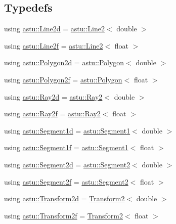 \subsection*{Typedefs}
\begin{DoxyCompactItemize}
\item 
using \hyperlink{group__math__group_ga9e9519d311982af417c5b7fd50fb4515}{astu\+::\+Line2d} = \hyperlink{classastu_1_1Line2}{astu\+::\+Line2}$<$ double $>$
\item 
using \hyperlink{group__math__group_ga6fbecdd0d3f742bdde8f5c000c3a8b5d}{astu\+::\+Line2f} = \hyperlink{classastu_1_1Line2}{astu\+::\+Line2}$<$ float $>$
\item 
using \hyperlink{group__math__group_gabc60e44721faec63659fd29e46d21522}{astu\+::\+Polygon2d} = \hyperlink{classastu_1_1Polygon}{astu\+::\+Polygon}$<$ double $>$
\item 
using \hyperlink{group__math__group_ga39ca0cd425ff5edd2a090d6997ce8c2a}{astu\+::\+Polygon2f} = \hyperlink{classastu_1_1Polygon}{astu\+::\+Polygon}$<$ float $>$
\item 
using \hyperlink{group__math__group_ga37ce0df4f800cdda11a64fa7d936a25d}{astu\+::\+Ray2d} = \hyperlink{classastu_1_1Ray2}{astu\+::\+Ray2}$<$ double $>$
\item 
using \hyperlink{group__math__group_gaa8986be7101408a7fbfdd07c73ecf8cb}{astu\+::\+Ray2f} = \hyperlink{classastu_1_1Ray2}{astu\+::\+Ray2}$<$ float $>$
\item 
using \hyperlink{group__math__group_ga3ed894c1b9f965fa9905c6f5a71ab5d4}{astu\+::\+Segment1d} = \hyperlink{classastu_1_1Segment1}{astu\+::\+Segment1}$<$ double $>$
\item 
using \hyperlink{group__math__group_gadaf20507cd638f02e10a5437a9810623}{astu\+::\+Segment1f} = \hyperlink{classastu_1_1Segment1}{astu\+::\+Segment1}$<$ float $>$
\item 
using \hyperlink{group__math__group_ga4a6a4a3ba71e40694ac08f39fa00a3bc}{astu\+::\+Segment2d} = \hyperlink{classastu_1_1Segment2}{astu\+::\+Segment2}$<$ double $>$
\item 
using \hyperlink{group__math__group_gab93de73c36660369f18786b88125e902}{astu\+::\+Segment2f} = \hyperlink{classastu_1_1Segment2}{astu\+::\+Segment2}$<$ float $>$
\item 
using \hyperlink{group__math__group_ga65979825a2f2857cba98d2d54a1df913}{astu\+::\+Transform2d} = \hyperlink{classastu_1_1Transform2}{Transform2}$<$ double $>$
\item 
using \hyperlink{group__math__group_gac67b5e9d27308a01ea8190ecb15e08fa}{astu\+::\+Transform2f} = \hyperlink{classastu_1_1Transform2}{Transform2}$<$ float $>$
\end{DoxyCompactItemize}



